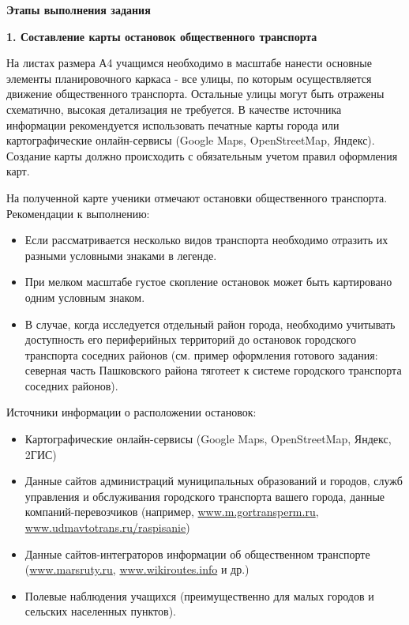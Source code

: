 \documentclass[
  11pt,
  russian,
]{book}
\begin{document}
\textbf{Этапы выполнения задания}

\textbf{1. Составление карты остановок общественного транспорта}

На листах размера А4 учащимся необходимо в масштабе нанести основные элементы планировочного каркаса
- все улицы, по которым осуществляется движение общественного транспорта. Остальные улицы могут быть отражены схематично, высокая детализация не требуется. В качестве источника информации рекомендуется использовать печатные карты города или картографические онлайн-сервисы (Google Maps, OpenStreetMap, Яндекс). Создание карты должно происходить с обязательным учетом правил оформления карт.

На полученной карте ученики отмечают остановки общественного транспорта. Рекомендации к выполнению:

\begin{itemize}
\item
  Если рассматривается несколько видов транспорта необходимо отразить их разными условными знаками в легенде.
\item
  При мелком масштабе густое скопление остановок может быть картировано одним условным знаком.
\item
  В случае, когда исследуется отдельный район города, необходимо учитывать доступность его периферийных территорий до остановок городского транспорта соседних районов (см. пример оформления готового задания:
  северная часть Пашковского района тяготеет к системе городского транспорта соседних районов).
\end{itemize}

Источники информации о расположении остановок:

\begin{itemize}
\item
  Картографические онлайн-сервисы (Google Maps, OpenStreetMap, Яндекс, 2ГИС)
\item
  Данные сайтов администраций муниципальных образований и городов, служб управления и обслуживания городского транспорта вашего города, данные компаний-перевозчиков (например, \href{http://www.m.gortransperm.ru}{www.m.gortransperm.ru}, \href{http://www.udmavtotrans.ru/raspisanie}{www.udmavtotrans.ru/raspisanie})
\item
  Данные сайтов-интеграторов информации об общественном транспорте (\href{http://www.marsruty.ru}{www.marsruty.ru}, \href{http://www.wikiroutes.info}{www.wikiroutes.info} и др.)
\item
  Полевые наблюдения учащихся (преимущественно для малых городов и сельских населенных пунктов).
\end{itemize}
\end{document}
